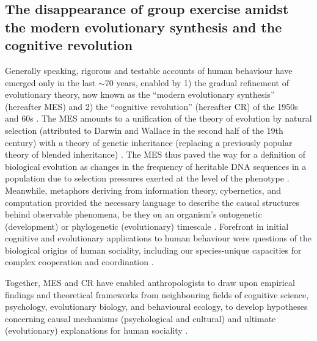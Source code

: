 \begin{CJK}{UTF8}{gbsn}
\subsection{The disappearance of group exercise amidst the modern evolutionary synthesis and the cognitive revolution}

Generally speaking, rigorous and testable accounts of human behaviour have emerged only in the last $\sim$70 years,  enabled by 1) the gradual refinement of evolutionary theory, now known as the ``modern evolutionary synthesis'' (hereafter MES) and 2) the ``cognitive revolution'' (hereafter CR) of the 1950s and 60s \citep{Fuentes2009}.  The MES amounts to a unification of the theory of evolution by natural selection (attributed to Darwin and Wallace in the second half of the 19th century) with a theory of genetic inheritance (replacing a previously popular theory of blended inheritance) \citep{Calcott2013}.  The MES thus paved the way for a definition of biological evolution as changes in the frequency of heritable DNA sequences in a population due to selection pressures exerted at the level of the phenotype \citep{Grafen1984}.  Meanwhile, metaphors deriving from information theory, cybernetics, and computation provided the necessary language to describe the causal structures behind observable phenomena, be they on an organism's ontogenetic (development) or phylogenetic (evolutionary) timescale \citep[refer, for example, to language of digital computation utilised by][]{Mayr1961}.  Forefront in initial cognitive and evolutionary applications to human behaviour were questions of the biological origins of human sociality, including our species-unique capacities for complex cooperation and coordination \citep{Wilson1975,Chomsky1965}.

Together, MES and CR have enabled anthropologists to draw upon empirical findings and theoretical frameworks from neighbouring fields of cognitive science, psychology, evolutionary biology, and behavioural ecology, to develop hypotheses concerning causal mechanisms (psychological and cultural) and ultimate (evolutionary) explanations for human sociality \cite[e.g.][; see Appendix ~\ref{app1:intro} Section ~\ref{sect:modernSynthesis} for a more detailed explanation of MS, CR, and their applications to human behaviour)]{Dawkins1976,Wilson1978,Sperber1996,Whitehouse2004,Dunbar1996}.


\end{CJK}
